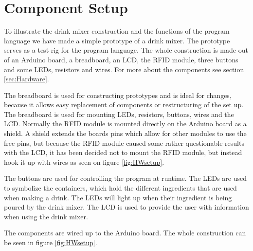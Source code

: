 \section{Component Setup}
\label{sec:Hardwaresetup}
To illustrate the drink mixer construction and the functions of the program language we have made a simple prototype of a drink mixer. The prototype serves as a test rig for the program language. The whole construction is made out of an Arduino board, a breadboard, an LCD, the RFID module, three buttons and some LEDs, resistors and wires. For more about the components see section \ref{sec:Hardware}.

The breadboard is used for constructing prototypes and is ideal for changes, because it allows easy replacement of components or restructuring of the set up. The breadboard is used for mounting LEDs, resistors, buttons, wires and the LCD.
Normally the RFID module is mounted directly on the Arduino board as a shield. A shield extends the boards pins which allow for other modules to use the free pins, but because the RFID module caused some rather questionable results with the LCD, it has been decided not to mount the RFID module, but instead hook it up with wires as seen on figure \ref{fig:HWsetup}.

The buttons are used for controlling the program at runtime. The LEDs are used to symbolize the containers, which hold the different ingredients that are used when making a drink. The LEDs will light up when their ingredient is being poured by the drink mixer. The LCD is used to provide the user with information when using the drink mixer.


The components are wired up to the Arduino board. The whole construction can be seen in figure \ref{fig:HWsetup}.